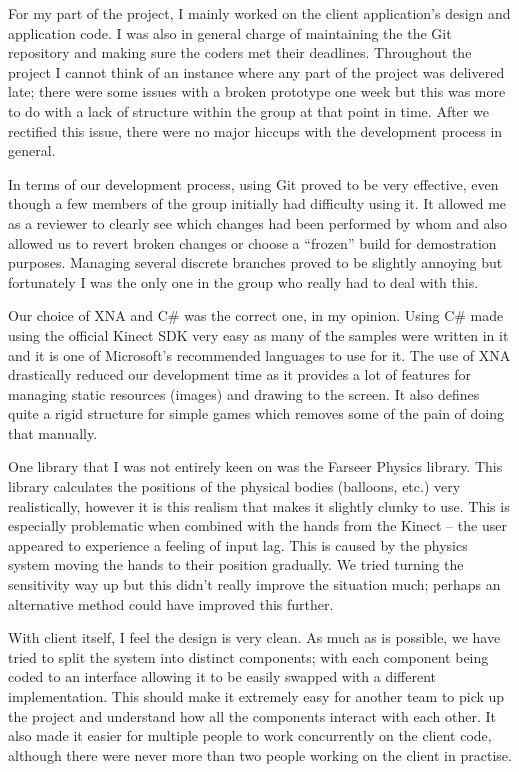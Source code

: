 For my part of the project, I mainly worked on the client application's design
and application code. I was also in general charge of maintaining the the Git
repository and making sure the coders met their deadlines. Throughout the
project I cannot think of an instance where any part of the project was
delivered late; there were some issues with a broken prototype one week but
this was more to do with a lack of structure within the group at that point in
time. After we rectified this issue, there were no major hiccups with the
development process in general.

In terms of our development process, using Git proved to be very effective, even
though a few members of the group initially had difficulty using it. It allowed
me as a reviewer to clearly see which changes had been performed by whom and
also allowed us to revert broken changes or choose a ``frozen'' build for 
demostration purposes. Managing several discrete branches proved to be slightly
annoying but fortunately I was the only one in the group who really had to deal
with this.

Our choice of XNA and C\# was the correct one, in my opinion. Using C\# made
using the official Kinect SDK very easy as many of the samples were written in
it and it is one of Microsoft's recommended languages to use for it. The use of
XNA drastically reduced our development time as it provides a lot of features
for managing static resources (images) and drawing to the screen. It also
defines quite a rigid structure for simple games which removes some of the pain
of doing that manually.

One library that I was not entirely keen on was the Farseer Physics library. This
library calculates the positions of the physical bodies (balloons, etc.) very
realistically, however it is this realism that makes it slightly clunky to use.
This is especially problematic when combined with the hands from the Kinect --
the user appeared to experience a feeling of input lag. This is caused by the
physics system moving the hands to their position gradually. We tried turning
the sensitivity way up but this didn't really improve the situation much; 
perhaps an alternative method could have improved this further.

With client itself, I feel the design is very clean. As much as is possible, we
have tried to split the system into distinct components; with each component
being coded to an interface allowing it to be easily swapped with a different
implementation. This should make it extremely easy for another team to pick up
the project and understand how all the components interact with each other. It
also made it easier for multiple people to work concurrently on the client code,
although there were never more than two people working on the client in 
practise.

